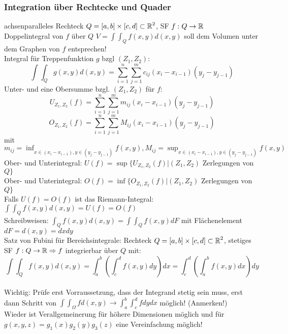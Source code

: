 \documentclass[german]{latex4ei/latex4ei_sheet}
\begin{document}
\subsubsection{Integration \"uber Rechtecke und Quader}
achsenparalleles Rechteck $Q = [a, b] \times [c, d] \subset \operatorname{\mathbb R}^2$, SF $f: Q \to \operatorname{\mathbb R}$\\
Doppelintegral von $f$ \"uber $Q$ $V=\int \int_Q f(x,y) d(x,y)$ soll dem Volumen unter dem Graphen von $f$ entsprechen!\\
Integral f\"ur Treppenfunktion $g$ bzgl $(Z_1,Z_2)$: \[\int \int_Q g(x,y)d(x,y)=\sum_{i=1}^n \sum_{j=1}^m c_{ij} (x_i-x_{i-1})(y_j-y_{j-1}) \]
Unter- und
eine Obersumme bzgl. $(Z_1,Z_2)$ f\"ur $f$: \[U_{Z_1,Z_2} (f)=\sum_{i=1}^n \sum_{j=1}^m m_{ij}(x_i-x_{i-1})(y_j-y_{j-1})\] \[O_{Z_1,Z_2} (f)=\sum_{i=1}^n \sum_{j=1}^m M_{ij}(x_i-x_{i-1})(y_j-y_{j-1})\]
mit $m_{ij}=\inf_{x\in (x_i-x_{i-1}),y \in (y_j-y_{j-1})} f(x,y), M_{ij}=\sup_{x\in (x_i-x_{i-1}),y \in (y_j-y_{j-1})} f(x,y)$\\
Ober- und Unterintegral: $U(f)=\sup \{U_{Z_1,Z_2}(f)|(Z_1,Z_2) $ Zerlegungen von $Q \}$\\
Ober- und Unterintegral: $O(f)=\inf \{O_{Z_1,Z_2}(f)|(Z_1,Z_2) $ Zerlegungen von $Q \}$\\
Falls $U(f)=O(f)$ ist das Riemann-Integral: $\int \int_Q f(x,y)d(x,y)=U(f)=O(f)$\\
Schreibweisen: $\int_Q f(x,y)d(x,y)=\int \int_Q f(x,y)d F$ mit Fl\"achenelement $d F=d(x,y)=d x d y$\\
Satz von Fubini f\"ur Bereichsintegrale: Rechteck $Q=[a,b] \times [c,d] \subset \operatorname{\mathbb R}^2$, stetiges SF $f: Q \to \operatorname{\mathbb R} \Rightarrow f$ integrierbar \"uber $Q$ mit: \[\int \int_Q f(x,y)d(x,y)=\int_a^b (\int_c^d f(x,y) d y)d x=\int_c^d (\int_a^b f(x,y) d x)d y\]\\
Wichtig: Pr\"ufe erst Vorraussetzung, dass der Integrand stetig sein muss, erst dann Schritt von $\int \int_\Omega f d(x,y) \to \int_a^b \int_c^d f d y d x$ m\"oglich! (Anmerken!) \\ 
Wieder ist Verallgemeinerung f\"ur h\"ohere Dimensionen m\"oglich und f\"ur $g(x,y,z)=g_1(x)g_2(y)g_3(z)$ eine Vereinfachung m\"oglich!
\end{document}
